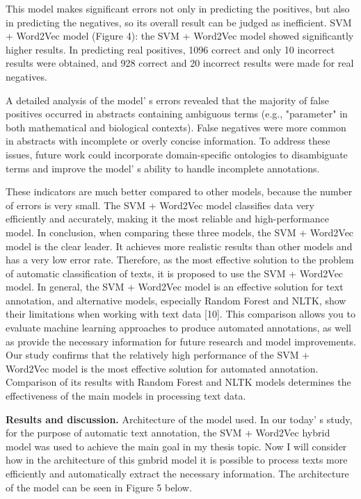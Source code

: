 This model makes significant errors not only in predicting the
positives, but also in predicting the negatives, so its overall result
can be judged as inefficient. SVM + Word2Vec model (Figure 4): the SVM +
Word2Vec model showed significantly higher results. In predicting real
positives, 1096 correct and only 10 incorrect results were obtained, and
928 correct and 20 incorrect results were made for real negatives.

A detailed analysis of the model' s errors revealed that
the majority of false positives occurred in abstracts containing
ambiguous terms (e.g., "parameter" in both mathematical and biological
contexts). False negatives were more common in abstracts with incomplete
or overly concise information. To address these issues, future work
could incorporate domain-specific ontologies to disambiguate terms and
improve the model' s ability to handle incomplete
annotations.

These indicators are much better compared to other models, because the
number of errors is very small. The SVM + Word2Vec model classifies data
very efficiently and accurately, making it the most reliable and
high-performance model. In conclusion, when comparing these three
models, the SVM + Word2Vec model is the clear leader. It achieves more
realistic results than other models and has a very low error rate.
Therefore, as the most effective solution to the problem of automatic
classification of texts, it is proposed to use the SVM + Word2Vec model.
In general, the SVM + Word2Vec model is an effective solution for text
annotation, and alternative models, especially Random Forest and NLTK,
show their limitations when working with text data {[}10{]}. This
comparison allows you to evaluate machine learning approaches to produce
automated annotations, as well as provide the necessary information for
future research and model improvements. Our study confirms that the
relatively high performance of the SVM + Word2Vec model is the most
effective solution for automated annotation. Comparison of its results
with Random Forest and NLTK models determines the effectiveness of the
main models in processing text data.

{\bfseries Results and discussion.} Architecture of the model used. In our
today' s study, for the purpose of automatic text
annotation, the SVM + Word2Vec hybrid model was used to achieve the main
goal in my thesis topic. Now I will consider how in the architecture of
this gmbrid model it is possible to process texts more efficiently and
automatically extract the necessary information. The architecture of the
model can be seen in Figure 5 below.

